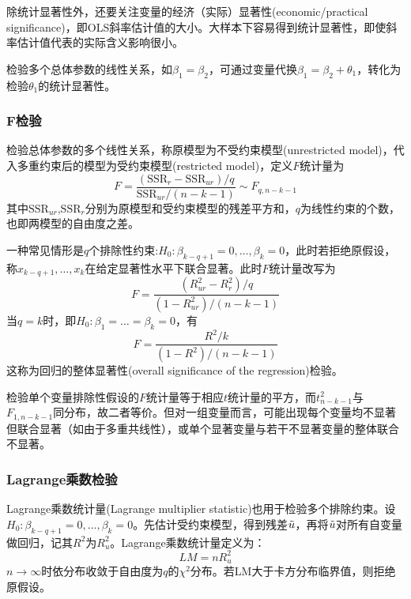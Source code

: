 \par 除统计显著性外，还要关注变量的经济（实际）显著性(economic/practical significance)，即OLS斜率估计值的大小。大样本下容易得到统计显著性，即使斜率估计值代表的实际含义影响很小。
\par 检验多个总体参数的线性关系，如$\beta_1=\beta_2$，可通过变量代换$\beta_1=\beta_2+\theta_1$，转化为检验$\theta_1$的统计显著性。

\subsubsection{F检验}
\par 检验总体参数的多个线性关系，称原模型为不受约束模型(unrestricted model)，代入多重约束后的模型为受约束模型(restricted model)，定义$F$统计量为
\begin{equation}
    F=\frac{(\text{SSR}_r-\text{SSR}_{ur})/q}{\text{SSR}_{ur}/(n-k-1)}\sim F_{q,n-k-1}
\end{equation}
其中$\text{SSR}_{ur}$,$\text{SSR}_{r}$分别为原模型和受约束模型的残差平方和，$q$为线性约束的个数，也即两模型的自由度之差。
\par 一种常见情形是$q$个排除性约束:$H_0:\beta_{k-q+1}=0,\dots,\beta_{k}=0$，此时若拒绝原假设，称$x_{k-q+1},\dots,x_{k}$在给定显著性水平下联合显著。此时$F$统计量改写为
\begin{equation}
    F=\frac{(R_{ur}^2-R_{r}^2)/q}{(1-R_{ur}^2)/(n-k-1)}
\end{equation}
当$q=k$时，即$H_0:\beta_1=\dots=\beta_k=0$，有
\begin{equation}
    F=\frac{R^2/k}{(1-R^2)/(n-k-1)}
\end{equation}
这称为回归的整体显著性(overall significance of the regression)检验。

\par 检验单个变量排除性假设的$F$统计量等于相应$t$统计量的平方，而$t_{n-k-1}^2$与$F_{1,n-k-1}$同分布，故二者等价。但对一组变量而言，可能出现每个变量均不显著但联合显著（如由于多重共线性），或单个显著变量与若干不显著变量的整体联合不显著。

\subsubsection{Lagrange乘数检验}

\par Lagrange乘数统计量(Lagrange multiplier statistic)也用于检验多个排除约束。设$H_0:\beta_{k-q+1}=0,\dots,\beta_{k}=0$。先估计受约束模型，得到残差$\Tilde{u}$，再将$\Tilde{u}$对所有自变量做回归，记其$R^2$为$R_u^2$。Lagrange乘数统计量定义为：
\begin{equation}
    LM=nR_u^2
\end{equation}
$n\to \infty$时依分布收敛于自由度为$q$的$\chi^2$分布。若LM大于卡方分布临界值，则拒绝原假设。

